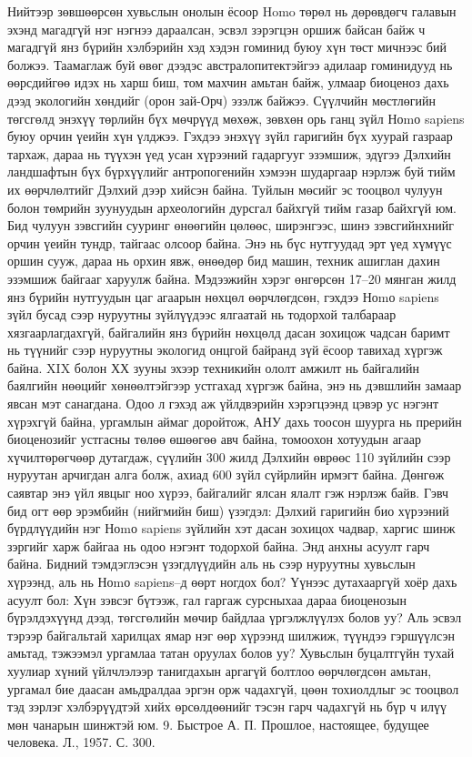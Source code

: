 Нийтээр зөвшөөрсөн хувьслын онолын ёсоор Homo төрөл нь дөрөвдөгч галавын эхэнд магадгүй нэг нэгнээ дараалсан, эсвэл зэрэгцэн оршиж байсан байж ч магадгүй янз бүрийн хэлбэрийн хэд хэдэн гоминид буюу хүн төст мичнээс бий болжээ. Таамаглаж буй өвөг дээдэс австралопитектэйгээ адилаар гоминидууд нь өөрсдийгөө идэх нь харш биш, том махчин амьтан байж, улмаар биоценоз дахь дээд экологийн хөндийг (орон зай-Орч) эзэлж байжээ. Сүүлчийн мөстлөгийн төгсгөлд энэхүү төрлийн бүх мөчрүүд мөхөж, зөвхөн орь ганц зүйл Ноmо sapiens буюу орчин үеийн хүн үлджээ. Гэхдээ энэхүү зүйл гаригийн бүх хуурай газраар тархаж, дараа нь түүхэн үед усан хүрээний гадаргууг эзэмшиж, эдүгээ Дэлхийн ландшафтын бүх бүрхүүлийг антропогенийн хэмээн шударгаар нэрлэж буй тийм их өөрчлөлтийг Дэлхий дээр хийсэн байна. Туйлын мөсийг эс тооцвол чулуун болон төмрийн зуунуудын археологийн дурсгал байхгүй тийм газар байхгүй юм. Бид чулуун зэвсгийн сууринг өнөөгийн цөлөөс, ширэнгээс, шинэ зэвсгийнхнийг орчин үеийн тундр, тайгаас олсоор байна. Энэ нь бүс нутгуудад эрт үед хүмүүс оршин сууж, дараа нь орхин явж, өнөөдөр бид машин, техник ашиглан дахин эзэмшиж байгааг харуулж байна. Мэдээжийн хэрэг өнгөрсөн 17–20 мянган жилд янз бүрийн нутгуудын цаг агаарын нөхцөл өөрчлөгдсөн, гэхдээ Ноmо sapiens зүйл бусад сээр нуруутны зүйлүүдээс ялгаатай нь тодорхой талбараар хязгаарлагдахгүй, байгалийн янз бүрийн нөхцөлд дасан зохицож чадсан баримт нь түүнийг сээр нуруутны экологид онцгой байранд зүй ёсоор тавихад хүргэж байна.
XIX болон ХХ зууны эхээр техникийн ололт амжилт нь байгалийн баялгийн нөөцийг хөнөөлтэйгээр устгахад хүргэж байна, энэ нь дэвшлийн замаар явсан мэт санагдана. Одоо л гэхэд аж үйлдвэрийн хэрэгцээнд цэвэр ус нэгэнт хүрэхгүй байна, ургамлын аймаг доройтож, АНУ дахь тоосон шуурга нь прерийн биоценозийг устгасны төлөө өшөөгөө авч байна, томоохон хотуудын агаар хүчилтөрөгчөөр дутагдаж, сүүлийн 300 жилд Дэлхийн өврөөс 110 зүйлийн сээр нуруутан арчигдан алга болж, ахиад 600 зүйл сүйрлийн ирмэгт байна. Дөнгөж саявтар энэ үйл явцыг ноо хүрээ, байгалийг ялсан ялалт гэж нэрлэж байв. Гэвч бид огт өөр эрэмбийн (нийгмийн биш) үзэгдэл: Дэлхий гаригийн био хүрээний бүрдлүүдийн нэг Ноmо sapiens зүйлийн хэт дасан зохицох чадвар, харгис шинж зэргийг харж байгаа нь одоо нэгэнт тодорхой байна.
Энд анхны асуулт гарч байна. Бидний тэмдэглэсэн үзэгдлүүдийн аль нь сээр нуруутны хувьслын хүрээнд, аль нь Ноmо sapiens–д өөрт ногдох бол? Үүнээс дутахааргүй хоёр дахь асуулт бол: Хүн зэвсэг бүтээж, гал гаргаж сурсныхаа дараа биоценозын бүрэлдэхүүнд дээд, төгсгөлийн мөчир байдлаа үргэлжлүүлэх болов уу? Аль эсвэл тэрээр байгальтай харилцах ямар нэг өөр хүрээнд шилжиж, түүндээ гэршүүлсэн амьтад, тэжээмэл ургамлаа татан оруулах болов уу? Хувьслын буцалтгүйн тухай хуулиар хүний үйлчлэлээр танигдахын аргагүй болтлоо өөрчлөгдсөн амьтан, ургамал бие даасан амьдралдаа эргэн орж чадахгүй, цөөн тохиолдлыг эс тооцвол тэд зэрлэг хэлбэрүүдтэй хийх өрсөлдөөнийг тэсэн гарч чадахгүй нь бүр ч илүү мөн чанарын шинжтэй юм. 9. Быстрое А. П. Прошлое, настоящее, будущее человека. Л., 1957. С. 300.
